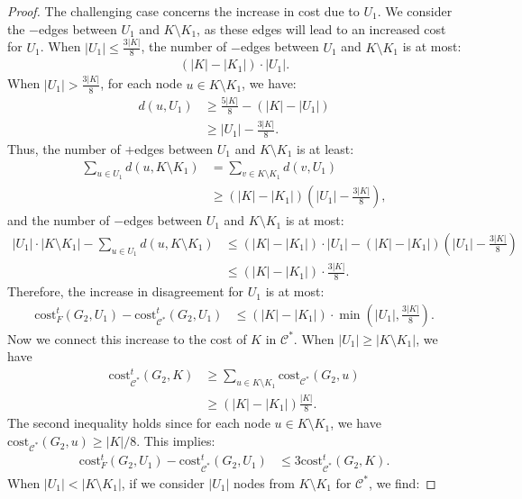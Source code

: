 \documentclass[11pt]{article}
\newcommand{\cost}{\mathrm{cost}}
\newcommand{\calC}{{\mathcal{C}}}
\begin{document}
\begin{CJK*}{UTF8}{gbsn}
\begin{proof}
The challenging case concerns the increase in cost due to $U_1$. We consider the $-$edges between $U_1$ and $K \setminus K_1$, as these edges will lead to an increased cost for $U_1$. When $|U_1| \leq \frac{3|K|}{8}$, the number of $-$edges between $U_1$ and $K \setminus K_1$ is at most:
\begin{align*}
(|K| - |K_1|) \cdot |U_1|.
\end{align*}
When $|U_1| > \frac{3|K|}{8}$, for each node $u \in K \setminus K_1$, we have:
\begin{align*}
    d(u, U_1) &\geq \frac{5|K|}{8} - (|K| - |U_1|) \\
    &\geq |U_1| - \frac{3|K|}{8}.
\end{align*}
Thus, the number of $+$edges between $U_1$ and $K \setminus K_1$ is at least:
\begin{align*}
    \sum_{u\in U_1}d(u, K \setminus K_1) &= \sum_{v \in K \setminus K_1}d(v, U_1) \\
    &\geq (|K| - |K_1|) (|U_1| - \frac{3|K|}{8}),
\end{align*}
and the number of $-$edges between $U_1$ and $K \setminus K_1$ is at most:
\begin{align*}
    |U_1| \cdot |K \setminus K_1| - \sum_{u\in U_1}d(u, K \setminus K_1) &\leq (|K| - |K_1|) \cdot |U_1| - (|K| - |K_1|) (|U_1| - \frac{3|K|}{8}) \\
    &\leq (|K| - |K_1|) \cdot \frac{3|K|}{8}.
\end{align*}
Therefore, the increase in disagreement for $U_1$ is at most:
\begin{align*}
    \cost^t_{F}(G_2, U_1) - \cost^t_{\mathcal{C}^*}(G_2, U_1) &\leq (|K| - |K_1|) \cdot \min(|U_1|, \frac{3|K|}{8}).
\end{align*}
Now we connect this increase to the cost of $K$ in $\calC^*$. When $|U_1| \geq |K \setminus K_1|$, we have 
\begin{align*}
    \cost^t_{\mathcal{C}^*}(G_2, K) &\geq \sum_{u \in K \setminus K_1} \cost_{\mathcal{C}^*}(G_2, u) \\
    &\geq (|K| - |K_1|) \frac{|K|}{8}.
\end{align*}
The second inequality holds since for each node $u \in K\setminus K_1$, we have $\cost_{\mathcal{C}^*}(G_2, u) \geq |K| / 8$. This implies:
\begin{align*}
    \cost^t_{F}(G_2, U_1) - \cost^t_{\mathcal{C}^*}(G_2, U_1) &\leq 3\cost^t_{\mathcal{C}^*}(G_2, K).
\end{align*}
When $|U_1| < |K \setminus K_1|$, if we consider $|U_1|$ nodes from $K \setminus K_1$ for $\mathcal{C}^*$, we find:

\end{proof}
\end{CJK*}
\end{document}
